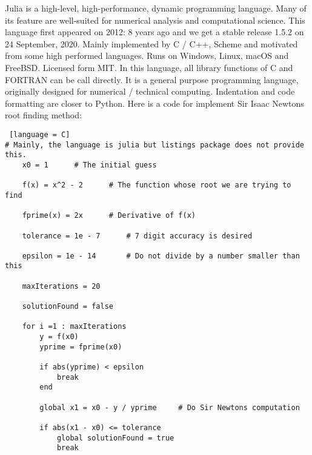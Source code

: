 Julia is a high-level, high-performance, dynamic programming language. Many of its feature are well-suited for numerical analysis and computational science. This language first appeared on 2012: 8 years ago and we get a stable release 1.5.2 on 24 September, 2020. Mainly implemented by C / C++, Scheme and motivated from some high performed languages. Runs on Windows, Linux, macOS and FreeBSD. Licensed form MIT. In this language, all library functions of C and FORTRAN can be call directly. It is a general purpose programming language, originally designed for numerical / technical computing. Indentation and code formatting are closer to Python. Here is a code for implement Sir Isaac Newtons root finding method:
\begin{lstlisting} [language = C]
# Mainly, the language is julia but listings package does not provide this.
	x0 = 1		# The initial guess
	
	f(x) = x^2 - 2		# The function whose root we are trying to find
	
	fprime(x) = 2x		# Derivative of f(x)
	
	tolerance = 1e - 7		# 7 digit accuracy is desired
	
	epsilon = 1e - 14		# Do not divide by a number smaller than this
	
	maxIterations = 20
	
	solutionFound = false
	
	for i =1 : maxIterations
		y = f(x0)
		yprime = fprime(x0)
		
		if abs(yprime) < epsilon
			break
		end
		
		global x1 = x0 - y / yprime		# Do Sir Newtons computation
		
		if abs(x1 - x0) <= tolerance
			global solutionFound = true
			break
\end{lstlisting}